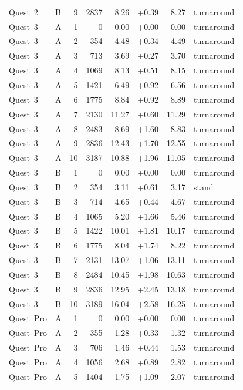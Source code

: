 {\begin{longtable}{llrrrrrl}
Quest~2 & B & 9 & 2837 & 8.26 & +0.39 & 8.27 & turnaround \\
\addlinespace
Quest~3 & A & 1 & 0 & 0.00 & +0.00 & 0.00 & turnaround \\
Quest~3 & A & 2 & 354 & 4.48 & +0.34 & 4.49 & turnaround \\
Quest~3 & A & 3 & 713 & 3.69 & +0.27 & 3.70 & turnaround \\
Quest~3 & A & 4 & 1069 & 8.13 & +0.51 & 8.15 & turnaround \\
Quest~3 & A & 5 & 1421 & 6.49 & +0.92 & 6.56 & turnaround \\
Quest~3 & A & 6 & 1775 & 8.84 & +0.92 & 8.89 & turnaround \\
Quest~3 & A & 7 & 2130 & 11.27 & +0.60 & 11.29 & turnaround \\
Quest~3 & A & 8 & 2483 & 8.69 & +1.60 & 8.83 & turnaround \\
Quest~3 & A & 9 & 2836 & 12.43 & +1.70 & 12.55 & turnaround \\
Quest~3 & A & 10 & 3187 & 10.88 & +1.96 & 11.05 & turnaround \\
\addlinespace
Quest~3 & B & 1 & 0 & 0.00 & +0.00 & 0.00 & turnaround \\
Quest~3 & B & 2 & 354 & 3.11 & +0.61 & 3.17 & stand \\
Quest~3 & B & 3 & 714 & 4.65 & +0.44 & 4.67 & turnaround \\
Quest~3 & B & 4 & 1065 & 5.20 & +1.66 & 5.46 & turnaround \\
Quest~3 & B & 5 & 1422 & 10.01 & +1.81 & 10.17 & turnaround \\
Quest~3 & B & 6 & 1775 & 8.04 & +1.74 & 8.22 & turnaround \\
Quest~3 & B & 7 & 2131 & 13.07 & +1.06 & 13.11 & turnaround \\
Quest~3 & B & 8 & 2484 & 10.45 & +1.98 & 10.63 & turnaround \\
Quest~3 & B & 9 & 2836 & 12.95 & +2.45 & 13.18 & turnaround \\
Quest~3 & B & 10 & 3189 & 16.04 & +2.58 & 16.25 & turnaround \\
\addlinespace
Quest~Pro & A & 1 & 0 & 0.00 & +0.00 & 0.00 & turnaround \\
Quest~Pro & A & 2 & 355 & 1.28 & +0.33 & 1.32 & turnaround \\
Quest~Pro & A & 3 & 706 & 1.46 & +0.44 & 1.53 & turnaround \\
Quest~Pro & A & 4 & 1056 & 2.68 & +0.89 & 2.82 & turnaround \\
Quest~Pro & A & 5 & 1404 & 1.75 & +1.09 & 2.07 & turnaround \\

\end{longtable}}
